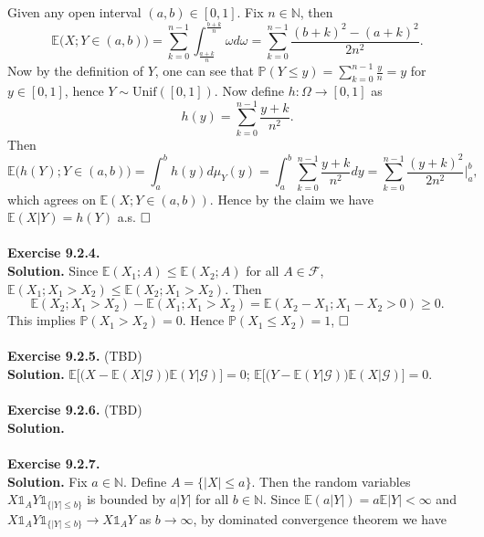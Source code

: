 \documentclass[12pt]{extarticle}
\begin{document}
Given any open interval $(a,b)\in[0,1]$. Fix $n\in\mathbb{N}$, then
\begin{equation*}
\mathbb{E}\big(X;Y\in(a,b)\big)=\sum_{k=0}^{n-1}\int_{\frac{a+k}{n}}^{\frac{b+k}{n}}\omega d\omega=\sum_{k=0}^{n-1}\frac{(b+k)^2-(a+k)^2}{2n^2}.
\end{equation*}
Now by the definition of $Y$, one can see that $\mathbb{P}(Y\leq y)=\sum_{k=0}^{n-1}\frac{y}{n}=y$ for $y\in[0,1]$, hence $Y\sim\text{Unif}([0,1])$. Now define $h:\Omega\rightarrow[0,1]$ as
\begin{equation*}
h(y)=\sum_{k=0}^{n-1}\frac{y+k}{n^2}.
\end{equation*}
Then
\begin{equation*}
\mathbb{E}\big(h(Y);Y\in(a,b)\big)=\int_a^bh(y)d\mu_Y(y)=\int_a^b\sum_{k=0}^{n-1}\frac{y+k}{n^2}dy=\sum_{k=0}^{n-1}\frac{(y+k)^2}{2n^2}\Bigr|_a^b,
\end{equation*}
which agrees on $\mathbb{E}(X;Y\in(a,b))$. Hence by the claim we have $\mathbb{E}(X|Y)=h(Y)$ a.s.
$\hspace{\fill}\square$
\\ \\
\textbf{Exercise 9.2.4.} \\
\textbf{Solution.} Since $\mathbb{E}(X_1;A)\leq\mathbb{E}(X_2;A)$ for all $A\in\mathcal{F}$, $\mathbb{E}(X_1;X_1>X_2)\leq\mathbb{E}(X_2;X_1>X_2)$. Then
\begin{equation*}
\mathbb{E}(X_2;X_1>X_2)-\mathbb{E}(X_1;X_1>X_2)=\mathbb{E}(X_2-X_1;X_1-X_2>0)\geq 0.
\end{equation*}
This implies $\mathbb{P}(X_1>X_2)=0$. Hence $\mathbb{P}(X_1\leq X_2)=1$,
$\hspace{\fill}\square$
\\ \\
\textbf{Exercise 9.2.5.} (TBD) \\
\textbf{Solution.} $\mathbb{E}\big[\big(X-\mathbb{E}(X|\mathcal{G})\big)\mathbb{E}(Y|\mathcal{G})\big]=0$; $\mathbb{E}\big[\big(Y-\mathbb{E}(Y|\mathcal{G})\big)\mathbb{E}(X|\mathcal{G})\big]=0$.
\\ \\
\textbf{Exercise 9.2.6.} (TBD) \\
\textbf{Solution.}
\\ \\
\textbf{Exercise 9.2.7.} \\
\textbf{Solution.} Fix $a\in\mathbb{N}$. Define $A=\{|X|\leq a\}$. Then the random variables $X\mathds{1}_AY\mathds{1}_{\{|Y|\leq b\}}$ is bounded by $a|Y|$ for all $b\in\mathbb{N}$. Since $\mathbb{E}(a|Y|)=a\mathbb{E}|Y|<\infty$ and $X\mathds{1}_AY\mathds{1}_{\{|Y|\leq b\}}\rightarrow X\mathds{1}_AY$ as $b\rightarrow\infty$, by dominated convergence theorem we have 
\end{document}
